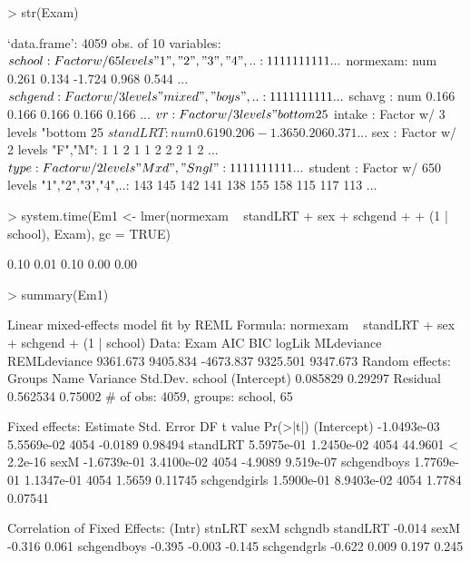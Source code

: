 \documentclass[12pt]{article}
\begin{document}
\begin{Schunk}
\begin{Sinput}
> str(Exam)
\end{Sinput}
\begin{Soutput}
`data.frame':	4059 obs. of  10 variables:
 $ school  : Factor w/ 65 levels "1","2","3","4",..: 1 1 1 1 1 1 1 1 1 1 ...
 $ normexam: num   0.261  0.134 -1.724  0.968  0.544 ...
 $ schgend : Factor w/ 3 levels "mixed","boys",..: 1 1 1 1 1 1 1 1 1 1 ...
 $ schavg  : num  0.166 0.166 0.166 0.166 0.166 ...
 $ vr      : Factor w/ 3 levels "bottom 25%","mi..",..: 2 2 2 2 2 2 2 2 2 2 ...
 $ intake  : Factor w/ 3 levels "bottom 25%","mi..",..: 1 2 3 2 2 1 3 2 2 3 ...
 $ standLRT: num   0.619  0.206 -1.365  0.206  0.371 ...
 $ sex     : Factor w/ 2 levels "F","M": 1 1 2 1 1 2 2 2 1 2 ...
 $ type    : Factor w/ 2 levels "Mxd","Sngl": 1 1 1 1 1 1 1 1 1 1 ...
 $ student : Factor w/ 650 levels "1","2","3","4",..: 143 145 142 141 138 155 158 115 117 113 ...
\end{Soutput}
\begin{Sinput}
> system.time(Em1 <- lmer(normexam ~ standLRT + sex + schgend + 
+     (1 | school), Exam), gc = TRUE)
\end{Sinput}
\begin{Soutput}
[1] 0.10 0.01 0.10 0.00 0.00
\end{Soutput}
\begin{Sinput}
> summary(Em1)
\end{Sinput}
\begin{Soutput}
Linear mixed-effects model fit by REML
Formula: normexam ~ standLRT + sex + schgend + (1 | school) 
   Data: Exam 
      AIC      BIC    logLik MLdeviance REMLdeviance
 9361.673 9405.834 -4673.837   9325.501     9347.673
Random effects:
 Groups   Name        Variance Std.Dev.
 school   (Intercept) 0.085829 0.29297 
 Residual             0.562534 0.75002 
# of obs: 4059, groups: school, 65

Fixed effects:
                Estimate  Std. Error   DF t value  Pr(>|t|)
(Intercept)  -1.0493e-03  5.5569e-02 4054 -0.0189   0.98494
standLRT      5.5975e-01  1.2450e-02 4054 44.9601 < 2.2e-16
sexM         -1.6739e-01  3.4100e-02 4054 -4.9089 9.519e-07
schgendboys   1.7769e-01  1.1347e-01 4054  1.5659   0.11745
schgendgirls  1.5900e-01  8.9403e-02 4054  1.7784   0.07541

Correlation of Fixed Effects:
            (Intr) stnLRT sexM   schgndb
standLRT    -0.014                      
sexM        -0.316  0.061               
schgendboys -0.395 -0.003 -0.145        
schgendgrls -0.622  0.009  0.197  0.245 
\end{Soutput}
\end{Schunk}
\end{document}
